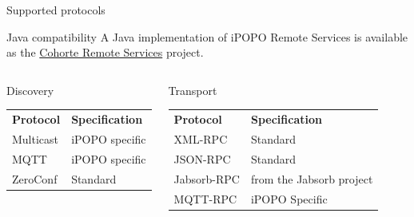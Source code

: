 \begin{frame}{Supported protocols}
\begin{exampleblock}{Java compatibility}
A Java implementation of iPOPO Remote Services is available as the \href{https://github.com/isandlaTech/cohorte-remote-services}{Cohorte Remote Services} project.
\end{exampleblock}

\begin{small}
\begin{columns}[t,onlytextwidth]
\begin{block}{Discovery}
\centering
\begin{tabular}{ll}
\textbf{Protocol} & \textbf{Specification}\\
Multicast & iPOPO specific\\
MQTT & iPOPO specific\\
ZeroConf & Standard\\
\end{tabular}
\end{block}

\begin{block}{Transport}
\centering
\begin{tabular}{ll}
\textbf{Protocol} & \textbf{Specification}\\
XML-RPC & Standard\\
JSON-RPC & Standard\\
Jabsorb-RPC & from the Jabsorb project\\
MQTT-RPC & iPOPO Specific\\
\end{tabular}
\end{block}
\end{columns}
\end{small}
\end{frame}
